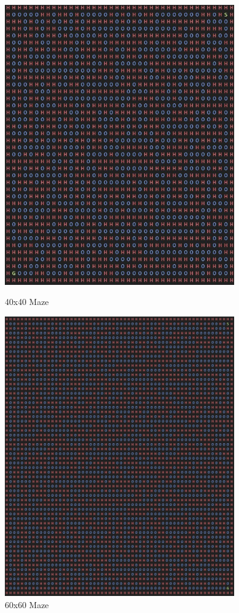 \documentclass[twoside, 12pt, a4paper]{article}
\begin{document}
\begin{figure}[ht]
\begin{center}
\includegraphics[width=10cm]{40x40.jpg} 
\caption{\label{tab:table-name}40x40 Maze}

\includegraphics[width=10cm]{60x60.jpg} 
\caption{\label{tab:table-name}60x60 Maze}
\end {center}
\end{figure}
\end{document}
